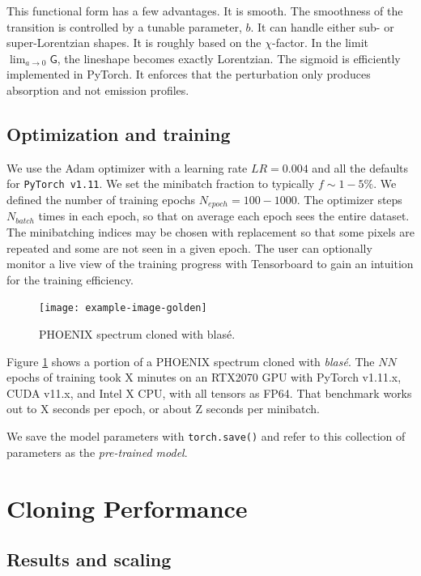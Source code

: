 \documentclass[modern]{aastex631}
\begin{document}
This functional form has a few advantages. It is smooth.  The smoothness of the transition is controlled by a tunable parameter, $b$.  It can handle either sub- or super-Lorentzian shapes.  It is roughly based on the $\chi$-factor.  In the limit $\lim_{a\to0} \mathsf{G}$, the lineshape becomes exactly Lorentzian.  The sigmoid is efficiently implemented in PyTorch.
It enforces that the perturbation only produces absorption and not emission profiles.


\subsection{Optimization and training}

We use the Adam optimizer with a learning rate $LR=0.004$ and all the defaults for \texttt{PyTorch v1.11}.  We set the minibatch fraction to typically $f\sim1-5\%$.  We defined the number of training epochs $N_{epoch}=100-1000$.  The optimizer steps $N_{batch}$ times in each epoch, so that on average each epoch sees the entire dataset.  The minibatching indices may be chosen with replacement so that some pixels are repeated and some are not seen in a given epoch.  The user can optionally monitor a live view of the training progress with Tensorboard to gain an intuition for the training efficiency.


\begin{figure}[hbt!]
  \centering
  \texttt{[image: example-image-golden]}
  \caption{PHOENIX spectrum cloned with blas\'e.}
  \label{fig_cloned_spectrum_demo}
\end{figure}

Figure \ref{fig_cloned_spectrum_demo} shows a portion of a PHOENIX spectrum cloned with \emph{blas\'e}.  The $NN$ epochs of training took X minutes on an RTX2070 GPU with PyTorch v1.11.x, CUDA v11.x, and Intel X CPU, with all tensors as FP64.  That benchmark works out to X seconds per epoch, or about Z seconds per minibatch.

We save the model parameters with \texttt{torch.save()} and refer to this collection of parameters as the \emph{pre-trained model}.

\section{Cloning Performance}

\subsection{Results and scaling}
\end{document}
